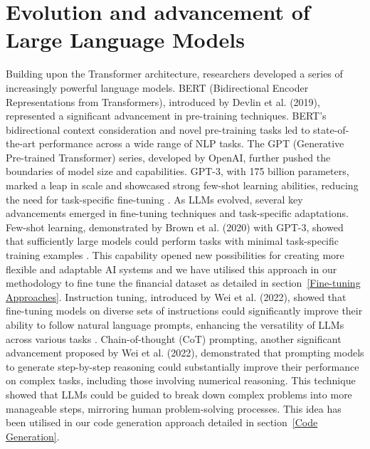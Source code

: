 \documentclass[logo,msc]{infthesis}           %
\begin{document}
\section{Evolution and advancement of Large Language Models}

Building upon the Transformer architecture, researchers developed a series of increasingly powerful language models. BERT (Bidirectional Encoder Representations from Transformers), introduced by Devlin et al. (2019)\cite{devlin2019bertpretrainingdeepbidirectional}, represented a significant advancement in pre-training techniques. BERT's bidirectional context consideration and novel pre-training tasks led to state-of-the-art performance across a wide range of NLP tasks. The GPT (Generative Pre-trained Transformer) series, developed by OpenAI, further pushed the boundaries of model size and capabilities. GPT-3, with 175 billion parameters, marked a leap in scale and showcased strong few-shot learning abilities, reducing the need for task-specific fine-tuning \cite{brown2020language}.
As LLMs evolved, several key advancements emerged in fine-tuning techniques and task-specific adaptations. Few-shot learning, demonstrated by Brown et al. (2020) with GPT-3, showed that sufficiently large models could perform tasks with minimal task-specific training examples \cite{brown2020language}. This capability opened new possibilities for creating more flexible and adaptable AI systems and we have utilised this approach in our methodology to fine tune the financial dataset as detailed in section~\ref{Fine-tuning Approaches}. Instruction tuning, introduced by Wei et al. (2022), showed that fine-tuning models on diverse sets of instructions could significantly improve their ability to follow natural language prompts, enhancing the versatility of LLMs across various tasks \cite{wei2022finetunedlanguagemodelszeroshot}.
Chain-of-thought (CoT) prompting, another significant advancement proposed by Wei et al. (2022), demonstrated that prompting models to generate step-by-step reasoning could substantially improve their performance on complex tasks, including those involving numerical reasoning\cite{wei2022chain}. This technique showed that LLMs could be guided to break down complex problems into more manageable steps, mirroring human problem-solving processes. This idea has been utilised in our code generation approach detailed in section~\ref{Code Generation}. 
\end{document}
